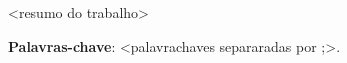 \begin{resumo}

\imprimirreferenciaobra

\textless resumo do trabalho\textgreater


\textbf{Palavras-chave}: \textless palavrachaves separaradas por ;\textgreater.
\end{resumo} 